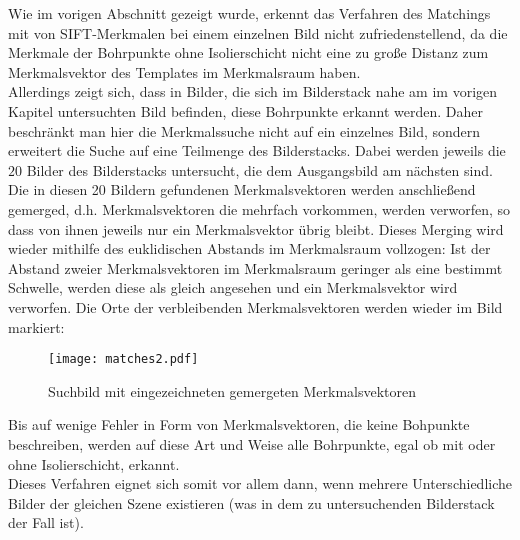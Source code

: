 Wie im vorigen Abschnitt gezeigt wurde, erkennt das Verfahren des Matchings mit von SIFT-Merkmalen bei einem einzelnen Bild nicht zufriedenstellend, da die Merkmale der Bohrpunkte ohne Isolierschicht nicht eine zu große Distanz zum Merkmalsvektor des Templates im Merkmalsraum haben. \\
Allerdings zeigt sich, dass in Bilder, die sich im Bilderstack nahe am im vorigen Kapitel untersuchten Bild befinden, diese Bohrpunkte erkannt werden. Daher beschränkt man hier die Merkmalssuche nicht auf ein einzelnes Bild, sondern erweitert die Suche auf eine Teilmenge des Bilderstacks. Dabei werden jeweils die $20$ Bilder des Bilderstacks untersucht, die dem Ausgangsbild am nächsten sind. \\
Die in diesen 20 Bildern gefundenen Merkmalsvektoren werden anschließend gemerged, d.h. Merkmalsvektoren die mehrfach vorkommen, werden verworfen, so dass von ihnen jeweils nur ein Merkmalsvektor übrig bleibt. Dieses Merging wird wieder mithilfe des euklidischen Abstands im Merkmalsraum vollzogen: Ist der Abstand zweier Merkmalsvektoren im Merkmalsraum geringer als eine bestimmt Schwelle, werden diese als gleich angesehen und ein Merkmalsvektor wird verworfen. Die Orte der verbleibenden Merkmalsvektoren werden wieder im Bild markiert:
\begin{figure}[H]
  \begin{center}
    \texttt{[image: matches2.pdf]}
    \caption{Suchbild mit eingezeichneten gemergeten Merkmalsvektoren}
    \label{fig:suchbild_merge_matches}
  \end{center}
\end{figure}

Bis auf wenige Fehler in Form von Merkmalsvektoren, die keine Bohpunkte beschreiben, werden auf diese Art und Weise alle Bohrpunkte, egal ob mit oder ohne Isolierschicht, erkannt. \\
Dieses Verfahren eignet sich somit vor allem dann, wenn mehrere Unterschiedliche Bilder der gleichen Szene existieren (was in dem zu untersuchenden Bilderstack der Fall ist).
 

